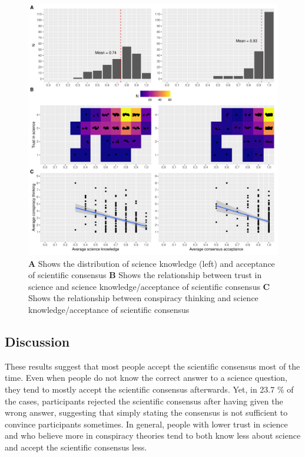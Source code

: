 \documentclass[
  doc,floatsintext]{apa6}
\begin{document}
\begin{figure}
\centering
\includegraphics{output/figures/exp1-plot.pdf}
\caption{\label{fig:exp1-plot}\textbf{A} Shows the distribution of science knowledge (left) and acceptance of scientific consensus \textbf{B} Shows the relationship between trust in science and science knowledge/acceptance of scientific consensus \textbf{C} Shows the relationship between conspiracy thinking and science knowledge/acceptance of scientific consensus}
\end{figure}

\subsection{Discussion}\label{discussion}

These results suggest that most people accept the scientific consensus most of the time. Even when people do not know the correct answer to a science question, they tend to mostly accept the scientific consensus afterwards. Yet, in 23.7 \% of the cases, participants rejected the scientific consensus after having given the wrong answer, suggesting that simply stating the consensus is not sufficient to convince participants sometimes. In general, people with lower trust in science and who believe more in conspiracy theories tend to both know less about science and accept the scientific consensus less.
\end{document}
